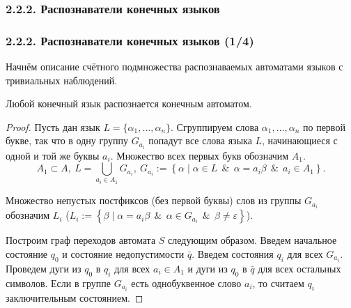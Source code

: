 \documentclass[mathserif,12pt,aspectratio=169]{beamer}
\def\Set#1#2{\left\{ #1 \mid #2 \right\}}
\def\Assign{\operatorname{:=}}
\def\And{\operatorname{\,\&\,}}
\begin{document}
\subsubsection{2.2.2. Распознаватели конечных языков}\label{2.2.2.}
\begin{frame}[shrink=22]
\frametitle{2.2.2. Распознаватели конечных языков (1/4)}


Начнём описание счётного подмножества распознаваемых автоматами
языков с тривиальных наблюдений.

\begin{theorem}
Любой конечный язык распознается конечным автоматом.
\end{theorem}

\begin{proof}
Пусть дан язык $L=\{\alpha_1,\dots,\alpha_n\}$. Сгруппируем слова
$\alpha_1,\dots,\alpha_n$  по первой букве, так что в одну группу
$G_{a_i}$ попадут все слова языка $L$, начинающиеся с одной и той
же буквы $a_i$. Множество всех первых букв обозначим $A_1$.
$$
A_1\subset A, ~L=\bigcup_{a_i\in A_1}G_{a_i},~
G_{a_i}\Assign\Set{\alpha}{\alpha\in L\And\alpha = a_i\beta\And
a_i\in A_1}.
$$

Множество непустых постфиксов (без первой буквы) слов из группы
$G_{a_i}$  обозначим $L_i$ ($L_i\Assign \Set{\beta}{\alpha = a_i
\beta\And \alpha\in G_{a_i} \And \beta\neq \varepsilon}$).

Построим граф переходов автомата $S$ следующим образом. Введем
начальное состояние $q_0$ и состояние недопустимости $\bar{q}$.
Введем состояния $q_i$ для всех $G_{a_i}$. Проведем дуги из $q_0$
в $q_i$ для всех $a_i \in A_1$ и дуги из $q_0$ в $\bar{q}$  для
всех остальных символов. Если в группе $G_{a_i}$ есть
однобуквенное слово $a_i$, то считаем $q_i$ заключительным
состоянием.
\end{proof}
\end{frame}
\end{document}
